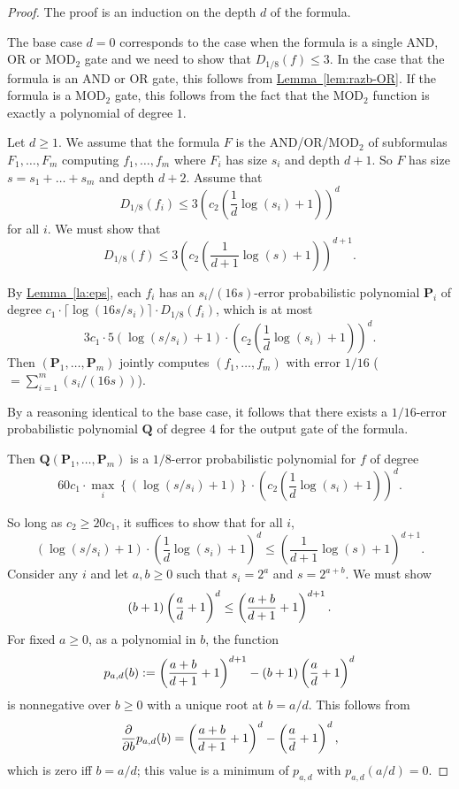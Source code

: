 \documentclass[11pt]{article}
\numberwithin{equation}{section}
\theoremstyle{definition}
\theoremstyle{plain}
\newcommand{\expref}[2]{\hyperref[#2]{#1~\ref{#2}}}
\newcommand{\mb}{\mathbf}
\begin{document}
\begin{proof}
The proof is an induction on the depth $d$ of the formula. 

The base case $d=0$ corresponds to the case when the formula is a single AND, OR or MOD$_2$  gate and we need to show that $D_{1/8}(f)\leq 3$. In the case that the formula is an AND or OR gate, this follows from \expref{Lemma}{lem:razb-OR}. If the formula is a MOD$_2$  gate, this follows from the fact that the MOD$_2$  function is exactly a polynomial of degree $1$. 

Let $d\ge 1$. We assume that the formula $F$ is the AND/OR/MOD$_2$  of
%
subformulas   %
$F_1,\ldots,F_m$ computing $f_1,\dots,f_m$ where $F_i$ has size $s_i$ and depth $d+1$. So $F$ has size $s = s_1+\dots+s_m$ and depth $d+2$. Assume that
\[
  D_{1/8}(f_i) \le 3\left(c_2\left(\frac{1}{d}\log(s_i)+1\right)\right)^d
\]
for all $i$. We must show that
\[
  D_{1/8}(f) \le 3\left(c_2\left(\frac{1}{d+1}\log(s)+1\right)\right)^{d+1}.
\]

By \expref{Lemma}{la:eps}, each $f_i$ has an $s_i/(16s)$-error probabilistic polynomial $\mb P_i$ of degree $c_1\cdot\lceil\log(16s/s_i)\rceil\cdot D_{1/8}(f_i)$, which is at most
\[
  3c_1 \cdot 5(\log(s/s_i)+1)\cdot \left(c_2\left(\frac{1}{d}\log(s_i)+1\right)\right)^d.
\]
Then $(\mb P_1,\dots,\mb P_m)$ jointly computes $(f_1,\dots,f_m)$ with error $1/16$ ($= \sum_{i=1}^m (s_i/(16 s))$). 

By a reasoning identical to the base case, it follows that there exists a $1/16$-error probabilistic polynomial $\mb Q$ of degree $4$ for the output gate of the formula. 

Then $\mb Q(\mb P_1,\dots,\mb P_m)$ is a $1/8$-error probabilistic polynomial for $f$ of degree
\[
  60c_1\cdot\max_i\left\{ (\log(s/s_i)+1)\right\} \cdot \left(c_2\left(\frac{1}{d}\log(s_i)+1\right)\right)^d.
\]

So long as $c_2 \ge 20c_1$, it suffices to show that for all $i$,
\[
  (\log(s/s_i)+1) \cdot \left(\frac{1}{d}\log(s_i)+1\right)^d
  \le
  \left(\frac{1}{d+1}\log(s)+1\right)^{d+1}.
\]
Consider any $i$ and let $a,b \ge 0$ such that $s_i = 2^a$ and $s = 2^{a+b}$. We must show
\[
  (b+1)\left(\frac{a\vphantom{b}}{d}+1\right)^d
  \le
  \left(\frac{a+b}{d+1}+1\right)^{d+1}.
\]
For fixed $a \ge 0$, as a polynomial in $b$, the function
\[
  p_{a,d}(b) := \left(\frac{a+b}{d+1}+1\right)^{d+1} - (b+1)\left(\frac{a\vphantom{b}}{d}+1\right)^d
\]
is nonnegative over $b \ge 0$ with a unique root at $b = a/d$. This follows from
\[
  \frac{\partial}{\partial b} p_{a,d}(b) = 
  \left(\frac{a+b}{d+1}+1\right)^d - \left(\frac{a\vphantom{b}}{d}+1\right)^d,
\]
which is zero iff $b = a/d$; this value is a minimum of $p_{a,d}$ with $p_{a,d}(a/d) = 0$.
\end{proof}
\end{document}
